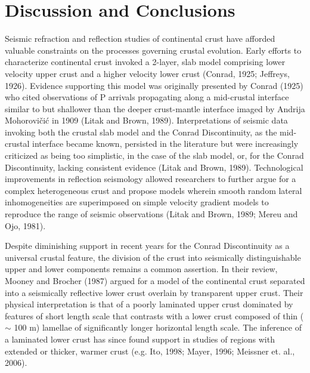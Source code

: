 \documentclass[review]{elsarticle}
\begin{document}
\section{Discussion and Conclusions}

Seismic refraction and reflection studies of continental crust have afforded valuable constraints on the processes governing crustal evolution. Early efforts to characterize continental crust invoked a 2-layer, slab model comprising lower velocity upper crust and a higher velocity lower crust (Conrad, 1925; Jeffreys, 1926). Evidence supporting this model was originally presented by Conrad (1925) who cited observations of P arrivals propagating along a mid-crustal interface similar to but shallower than the deeper crust-mantle interface imaged by Andrija Mohorovičić in 1909 (Litak and Brown, 1989). Interpretations of seismic data invoking both the crustal slab model and the Conrad Discontinuity, as the mid-crustal interface became known, persisted in the literature but were increasingly criticized as being too simplistic, in the case of the slab model, or, for the Conrad Discontinuity, lacking consistent evidence (Litak and Brown, 1989). Technological improvements in reflection seismology allowed researchers to further argue for a complex heterogeneous crust and propose models wherein smooth random lateral inhomogeneities are superimposed on simple velocity gradient models to reproduce the range of seismic observations (Litak and Brown, 1989; Mereu and Ojo, 1981).

Despite diminishing support in recent years for the Conrad Discontinuity as a universal crustal feature, the division of the crust into seismically distinguishable upper and lower components remains a common assertion. In their review, Mooney and Brocher (1987) argued for a model of the continental crust separated into a seismically reflective lower crust overlain by transparent upper crust. Their physical interpretation is that of a poorly laminated upper crust dominated by features of short length scale that contrasts with a lower crust composed of thin ($\sim$ 100 m) lamellae of significantly longer horizontal length scale. The inference of a laminated lower crust has since found support in studies of regions with extended or thicker, warmer crust (e.g. Ito, 1998; Mayer, 1996; Meissner et. al., 2006).
\end{document}
